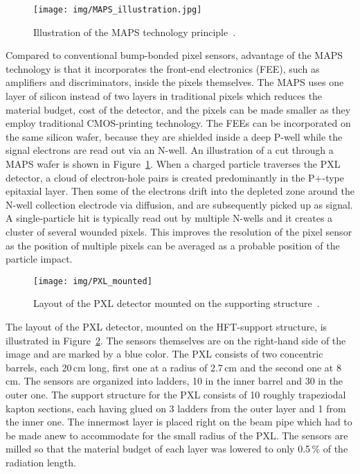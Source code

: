 \begin{figure}[!htb]
\begin{center}
 \texttt{[image: img/MAPS\_illustration.jpg]}\\
\end{center}
\caption{\label{MAPS}Illustration of the MAPS technology principle~\cite{MAPS_illustration}.}
\end{figure}

Compared to conventional bump-bonded pixel sensors, advantage of the MAPS technology is that it incorporates the front-end electronics (FEE), such as amplifiers and discriminators, inside the pixels themselves. The MAPS uses one layer of silicon instead of two layers in traditional pixels which reduces the material budget, cost of the detector, and the pixels can be made smaller as they employ traditional CMOS-printing technology. The FEEs can be incorporated on the same silicon wafer, because they are shielded inside a deep P-well while the signal electrons are read out via an N-well. An illustration of a cut through a MAPS wafer is shown in Figure~\ref{MAPS}\@. When a charged particle traverses the PXL detector, a cloud of electron-hole pairs is created predominantly in the P+-type epitaxial layer. Then some of the electrons drift into the depleted zone around the N-well collection electrode via diffusion, and are subsequently picked up as signal. A single-particle hit is typically read out by multiple N-wells and it creates a cluster of several wounded pixels. This improves the resolution of the pixel sensor as the position of multiple pixels can be averaged as a probable position of the particle impact.

\begin{figure}[!htb]
\begin{center}
 \texttt{[image: img/PXL\_mounted]}\\
\end{center}
\caption{\label{PXL}Layout of the PXL detector mounted on the supporting structure~\cite{HftTdr}.}
\end{figure}

The layout of the PXL detector, mounted on the HFT-support structure, is illustrated in Figure~\ref{PXL}\@. The sensors themselves are on the right-hand side of the image and are marked by a blue color. The PXL consists of two concentric barrels, each 20$\,$cm long, first one at a radius of 2.7$\,$cm and the second one at 8$\,$cm.  The sensors are organized into ladders, 10 in the inner barrel and 30 in the outer one. The support structure for the PXL consists of 10 roughly trapeziodal kapton sections, each having glued on 3 ladders from the outer layer and 1 from the inner one. The innermost layer is placed right on the beam pipe which had to be made anew to accommodate for the small radius of the PXL\@. The sensors are milled so that the material budget of each layer was lowered to only 0.5$\,\%$ of the radiation length.


